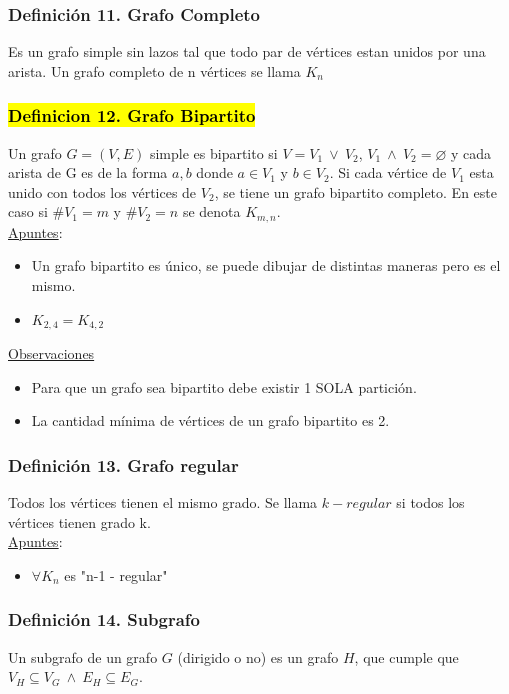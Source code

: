 \documentclass{article}
\newcommand{\lands}{\:\land\:}                          %
\newcommand{\vees}{\:\vee\:}                            %
\begin{document}
\subsubsection*{Definición 11. Grafo Completo}
Es un grafo simple sin lazos tal que todo par de vértices estan unidos por una arista. Un
grafo completo de n vértices se llama $K_n$

\subsubsection*{\hl{Definicion 12. Grafo Bipartito}}
Un grafo $G=(V,E)$ simple es bipartito si $V=V_1 \vees V_2$, $V_1 \lands V_2=\varnothing$ y cada arista de G es de la forma $a,b$ donde $a \in V_1$ y $b \in V_2$.
Si cada vértice de $V_1$ esta unido con todos los vértices de $V_2$, se tiene un grafo bipartito completo. 
En este caso si $\#V_1=m$ y $\#V_2=n$ se denota $K_{m,n}$.
\\\underline{Apuntes}:
\begin{itemize}
    \item Un grafo bipartito es único, se puede dibujar de distintas maneras pero es el mismo.
    \item $K_{2,4} = K_{4,2}$
\end{itemize}
\underline{Observaciones}
\begin{itemize}
    \item Para que un grafo sea bipartito debe existir 1 SOLA partición.
    \item La cantidad mínima de vértices de un grafo bipartito es 2.
\end{itemize}

\subsubsection*{Definición 13. Grafo regular}
Todos los vértices tienen el mismo grado. Se llama $k-regular$ si todos los vértices tienen grado k.
\\\underline{Apuntes}:
\begin{itemize}
    \item $\forall K_n$ es "n-1 - regular"
\end{itemize}

\subsubsection*{Definición 14. Subgrafo}
Un subgrafo de un grafo $G$ (dirigido o no) es un grafo $H$, que cumple que $V_H \subseteq V_G \lands E_H \subseteq E_G$.
\end{document}
